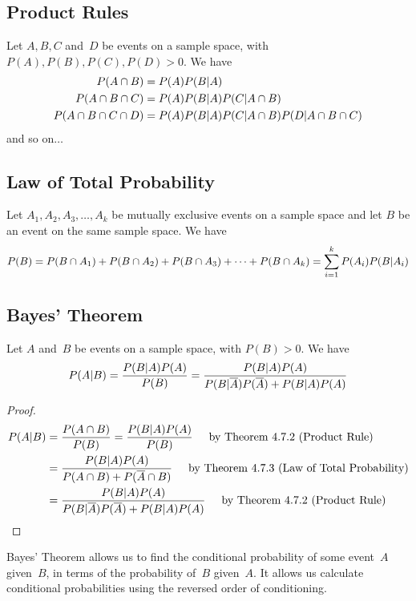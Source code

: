 \subsection*{Product Rules}
\begin{theorem}
Let $A, B, C$ and~$D$ be events on a sample space, with $P(A), P(B), P(C), P(D) > 0$. We have
\begin{align*}
    P(A \cap B) &= P(A)P(B \vert A) \\
    P(A \cap B \cap C) &= P(A)P(B \vert A)P(C \vert A \cap B) \\
    P(A \cap B \cap C \cap D) &=
    P(A)P(B \vert A)P(C \vert A \cap B)P(D \vert A \cap B \cap C) \\
\end{align*}
and so on$\ldots$
\end{theorem}
\subsection*{Law of Total Probability}
\begin{theorem}
Let $A_1, A_2, A_3,\ldots,A_k$ be mutually exclusive events on a sample space and let $B$ be an event on the same sample space. We have
\[
    P(B) = P(B \cap A_1) + P(B \cap A_2) + P(B \cap A_3) + \cdots + P(B \cap A_k)
    = \sum_{i = 1}^{k} P(A_i)P(B \vert A_i)
\]
\end{theorem}
\subsection*{Bayes' Theorem}
\begin{theorem}
Let $A$ and~$B$ be events on a sample space, with $P(B) > 0$. We have
\[
    P(A \vert B) = \frac{P(B \vert A)P(A)}{P(B)}
    = \frac{P(B \vert A)P(A)}{P(B \vert \overline{A})P(\overline{A}) + P(B \vert A)P(A)}
\]
\end{theorem}
\begin{proof}
\begin{align*}
    P(A \vert B)
    &= \frac{P(A \cap B)}{P(B)} 
    = \frac{P(B \vert A)P(A)}{P(B)}\hspace{5mm}\text{by Theorem 4.7.2 (Product Rule)} \\
    &= \frac{P(B \vert A)P(A)}{P(A \cap B) + P(\overline{A} \cap B)}
    \hspace{5mm}\text{by Theorem 4.7.3 (Law of Total Probability)} \\
    &= \frac{P(B \vert A)P(A)}{P(B \vert \overline{A})P(\overline{A}) + P(B \vert A)P(A)}\hspace{5mm}\text{by Theorem 4.7.2 (Product Rule)}
\end{align*}
\end{proof}
\begin{info}
Bayes' Theorem allows us to find the conditional probability of some event~$A$ given~$B$, in terms of the probability of~$B$ given~$A$. It allows us calculate conditional probabilities using the reversed order of conditioning.
\end{info}
